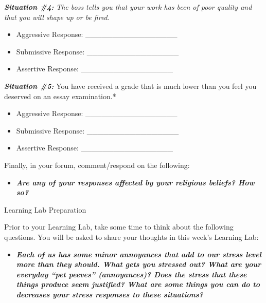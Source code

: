 \documentclass[
]{book}
\providecommand{\tightlist}{%
  \setlength{\itemsep}{0pt}\setlength{\parskip}{0pt}}
\begin{document}
\begin{reflect}
\textbf{\emph{Situation \#4:}} \emph{The boss tells you that your work has been of poor quality and that you will shape up or be fired.}

\begin{itemize}
\tightlist
\item
  Aggressive Response: \_\_\_\_\_\_\_\_\_\_\_\_\_\_\_\_\_\\
\item
  Submissive Response: \_\_\_\_\_\_\_\_\_\_\_\_\_\_\_\_\_\\
\item
  Assertive Response: \_\_\_\_\_\_\_\_\_\_\_\_\_\_\_\_\_
\end{itemize}

\textbf{\emph{Situation \#5:}} You have received a grade that is much lower than you feel you deserved on an essay examination.*

\begin{itemize}
\tightlist
\item
  Aggressive Response: \_\_\_\_\_\_\_\_\_\_\_\_\_\_\_\_\_\\
\item
  Submissive Response: \_\_\_\_\_\_\_\_\_\_\_\_\_\_\_\_\_\\
\item
  Assertive Response: \_\_\_\_\_\_\_\_\_\_\_\_\_\_\_\_\_
\end{itemize}

Finally, in your forum, comment/respond on the following:

\begin{itemize}
\tightlist
\item
  \textbf{\emph{Are any of your responses affected by your religious beliefs? How so?}}
\end{itemize}

{Learning Lab Preparation}

Prior to your Learning Lab, take some time to think about the following questions. You will be asked to share your thoughts in this week's Learning Lab:

\begin{itemize}
\tightlist
\item
  \textbf{\emph{Each of us has some minor annoyances that add to our stress level more than they should. What gets you stressed out? What are your everyday ``pet peeves'' (annoyances)? Does the stress that these things produce seem justified? What are some things you can do to decreases your stress responses to these situations?}}
\end{itemize}
\end{reflect}
\end{document}
